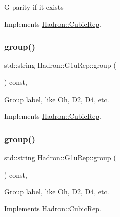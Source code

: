 G-\/parity if it exists 

Implements \mbox{\hyperlink{structHadron_1_1CubicRep_a52104e43266d1614c00bbd1c3b395458}{Hadron\+::\+Cubic\+Rep}}.

\mbox{\label{structHadron_1_1G1uRep_a8d180c78f98256ab0c502e87e2495295}} 
\subsubsection{\texorpdfstring{group()}{group()}\hspace{0.1cm}{\footnotesize\ttfamily [1/2]}}
{\footnotesize\ttfamily std\+::string Hadron\+::\+G1u\+Rep\+::group (\begin{DoxyParamCaption}{ }\end{DoxyParamCaption}) const\hspace{0.3cm}{\ttfamily [inline]}, {\ttfamily [virtual]}}

Group label, like Oh, D2, D4, etc. 

Implements \mbox{\hyperlink{structHadron_1_1CubicRep_a0748f11ec87f387062c8e8981339a29c}{Hadron\+::\+Cubic\+Rep}}.

\mbox{\label{structHadron_1_1G1uRep_a8d180c78f98256ab0c502e87e2495295}} 
\subsubsection{\texorpdfstring{group()}{group()}\hspace{0.1cm}{\footnotesize\ttfamily [2/2]}}
{\footnotesize\ttfamily std\+::string Hadron\+::\+G1u\+Rep\+::group (\begin{DoxyParamCaption}{ }\end{DoxyParamCaption}) const\hspace{0.3cm}{\ttfamily [inline]}, {\ttfamily [virtual]}}

Group label, like Oh, D2, D4, etc. 

Implements \mbox{\hyperlink{structHadron_1_1CubicRep_a0748f11ec87f387062c8e8981339a29c}{Hadron\+::\+Cubic\+Rep}}.

\mbox{\label{structHadron_1_1G1uRep_a44a6e8bf681031b6d490fe23dd05aaad}} 
